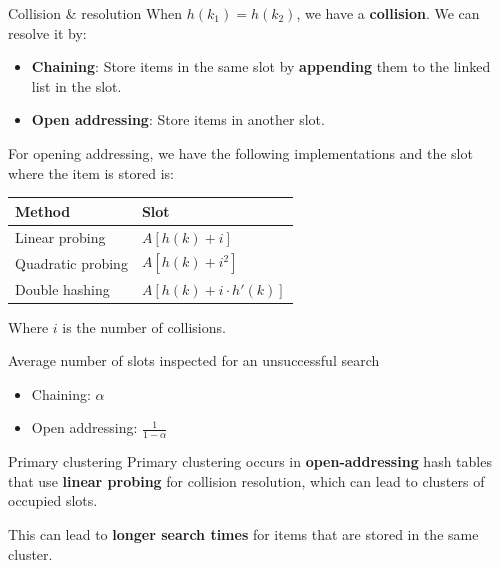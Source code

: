 \begin{theorem}
    {Collision \& resolution}
    When $h(k_1) = h(k_2)$, we have a \textbf{collision}. We can resolve it by:
    \begin{itemize}
        \item \textbf{Chaining}: Store items in the same slot by \textbf{appending} them to the linked list in the slot.
        \item \textbf{Open addressing}: Store items in another slot.
    \end{itemize}
    For opening addressing, we have the following implementations and the slot where the item is stored is:

    \begin{tabular}{|l|l|}
        \hline
        \textbf{Method}   & \textbf{Slot}             \\
        \hline
        Linear probing    & $A[h(k) + i]$             \\
        Quadratic probing & $A[h(k) + i^2]$           \\
        Double hashing    & $A[h(k) + i \cdot h'(k)]$ \\
        \hline
    \end{tabular}

    Where $i$ is the number of collisions.
\end{theorem}

\begin{theorem}
    {Average number of slots inspected for an unsuccessful search}
    \begin{itemize}
        \item Chaining: $\alpha$
        \item Open addressing: $\frac{1}{1-\alpha}$
    \end{itemize}
\end{theorem}

\begin{knBox}
    {Primary clustering}
    Primary clustering occurs in \textbf{open-addressing} hash tables that use \textbf{linear probing} for collision resolution, which can lead to clusters of occupied slots.

    This can lead to \textbf{longer search times} for items that are stored in the same cluster.
\end{knBox}

\label{thm:collision-resolution}
